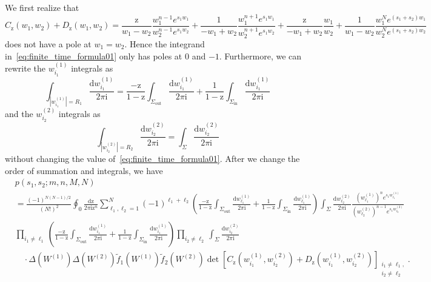 \documentclass{article}
\numberwithin{equation}{section}
\newcommand{\ddbar}[2]{\frac{{\mathrm d}#1}{2\pi {\mathrm i}#2}}
\newcommand{\inn}{\mathrm{in}}
\newcommand{\out}{\mathrm{out}}
\newcommand{\rz}{\mathrm{z}}
\begin{document}
We first realize that
\begin{equation*}
	C_\rz(w_1,w_2)+D_\rz(w_1,w_2)
	  = 
        \frac{ \rz } {w_1-w_2}
	    \frac{ w_1^{n-1} e^{s_1 w_1} }
             { w_2^{n-1} e^{s_1 w_2} }
	 +  \frac{ 1 } {-w_1+w_2}
	    \frac{ w_1^{n+1} e^{s_1 w_1} }
	         { w_2^{n+1} e^{s_1 w_2} }
	 +  \frac{ \rz } {-w_1+w_2}
        \frac{ w_1 } { w_2 }
     +  \frac{ 1 } {w_1-w_2}
        \frac{ w_1^{N} e^{(s_1+s_2) w_1} }
             { w_2^{N} e^{(s_1+s_2) w_2} }
\end{equation*}
does not have a pole at $w_1=w_2$. Hence the integrand in~\eqref{eq:finite_time_formula01} only has poles at $0$ and $-1$. Furthermore, we can rewrite the $w_{i_1}^{(1)}$ integrals as
\begin{equation}
	\label{eq:contour_repalce01}
	\int_{|w_{i_1}^{(1)}|=R_1} \ddbar{w_{i_1}^{(1)}}{}
	=\frac{-\rz}{1-\rz} \int_{\Sigma_{\out}}
	  \ddbar{w_{i_1}^{(1)}}{}
	+\frac{1}{1-\rz}  \int_{\Sigma_{\inn}}
	  \ddbar{w_{i_1}^{(1)}}{}
\end{equation}
and the $w_{i_2}^{(2)}$ integrals as
\begin{equation}
		\label{eq:contour_repalce02}
	\int_{|w_{i_2}^{(2)}|=R_2} \ddbar{w_{i_2}^{(2)}}{}=\int_{\Sigma} \ddbar{w_{i_2}^{(2)}}{}
\end{equation}
without changing the value of~\eqref{eq:finite_time_formula01}. After we change the order of summation and integrals, we have
	\begin{equation}
	\label{eq:finite_time_formula03}
	\begin{split}
		& p(s_1,s_2;m,n,M,N) \\
		& = \frac{(-1)^{N(N-1)/2}}
		{(N!)^2}
		\oint_0\ddbar{\rz}{\rz^{n}}
		\sum_{\ell_1,\ell_2=1}^N (-1)^{\ell_1+\ell_2}
		\left( \frac{-\rz}{1-\rz} \int_{\Sigma_{\out}}
		                          \ddbar{w_{\ell_1}^{(1)}}{}
		      +\frac{1}{1-\rz}  \int_{\Sigma_{\inn}}
		                          \ddbar{w_{\ell_1}^{(1)}}{}
		\right)
		\int_{\Sigma} \ddbar{w_{\ell_2}^{(2)}}{}
		   \frac{ \left(w_{\ell_1}^{(1)}\right)^n e^{s_1 w_{\ell_1}^{(1)}} }
		        { \left(w_{\ell_2}^{(2)}\right)^{n-1} e^{s_1 w_{\ell_2}^{(2)}} }\\
		&
		\prod_{i_1\ne \ell_1} \left( \frac{-\rz}{1-\rz} \int_{\Sigma_{\out}}
		                                                \ddbar{w_{i_1}^{(1)}}{}
	                             	+\frac{1}{1-\rz}  \int_{\Sigma_{\inn}}
		                                              \ddbar{w_{i_1}^{(1)}}{}
		                      \right)
		\prod_{i_2\ne \ell_2} \int_{\Sigma} \ddbar{w_{i_2}^{(2)}}{}
		\\
		&\quad \cdot
		\Delta\left(W^{(1)}\right)
		\Delta\left(W^{(2)}\right)
		\tilde f_1\left( W^{(1)} \right)
		\tilde f_2\left( W^{(2)} \right)
		\det\left[
		C_\rz\left(w_{i_1}^{(1)},w_{i_2}^{(2)}\right)
		+
		D_\rz\left(w_{i_1}^{(1)},w_{i_2}^{(2)}\right)
		\right]_{\substack{i_1\ne \ell_1,\\
				i_2\ne \ell_2}
		}.
	\end{split}   
\end{equation}
\end{document}
